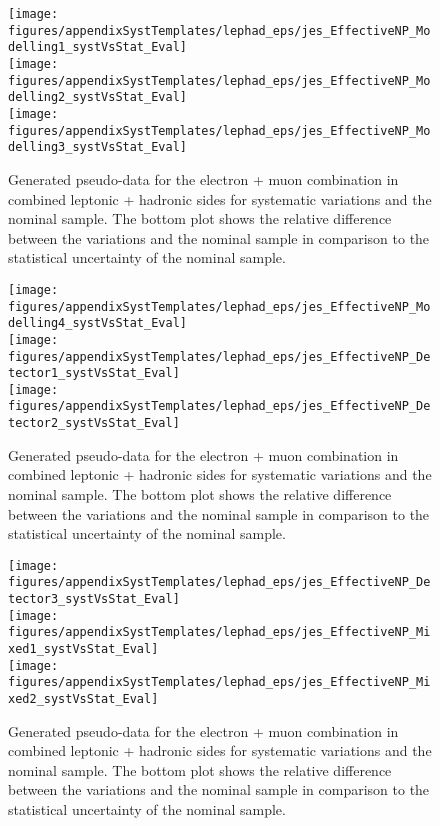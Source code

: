 \begin{figure}[!hb]
\begin{center}
        \texttt{[image: figures/appendixSystTemplates/lephad\_eps/jes\_EffectiveNP\_Modelling1\_systVsStat\_Eval]}\\
        \texttt{[image: figures/appendixSystTemplates/lephad\_eps/jes\_EffectiveNP\_Modelling2\_systVsStat\_Eval]}\\
        \texttt{[image: figures/appendixSystTemplates/lephad\_eps/jes\_EffectiveNP\_Modelling3\_systVsStat\_Eval]}
\caption{Generated pseudo-data for the electron + muon combination in combined leptonic + hadronic sides for systematic variations and the nominal \ttbar sample. The bottom plot shows the relative difference between the variations and the nominal sample in comparison to the statistical uncertainty of the nominal sample.}   
\label{fig:systematicVar_lephad_JES_1_2}
\end{center}
\end{figure}
        
\begin{figure}[!hb]
\begin{center}
        \texttt{[image: figures/appendixSystTemplates/lephad\_eps/jes\_EffectiveNP\_Modelling4\_systVsStat\_Eval]}\\
        \texttt{[image: figures/appendixSystTemplates/lephad\_eps/jes\_EffectiveNP\_Detector1\_systVsStat\_Eval]}\\
        \texttt{[image: figures/appendixSystTemplates/lephad\_eps/jes\_EffectiveNP\_Detector2\_systVsStat\_Eval]}
        
\caption{Generated pseudo-data for the electron + muon combination in combined leptonic + hadronic sides for systematic variations and the nominal \ttbar sample. The bottom plot shows the relative difference between the variations and the nominal sample in comparison to the statistical uncertainty of the nominal sample.}   
\label{fig:systematicVar_lephad_JES_2_1}
\end{center}
\end{figure}

\begin{figure}[!hb]
\begin{center}
        \texttt{[image: figures/appendixSystTemplates/lephad\_eps/jes\_EffectiveNP\_Detector3\_systVsStat\_Eval]}\\
        \texttt{[image: figures/appendixSystTemplates/lephad\_eps/jes\_EffectiveNP\_Mixed1\_systVsStat\_Eval]}\\
        \texttt{[image: figures/appendixSystTemplates/lephad\_eps/jes\_EffectiveNP\_Mixed2\_systVsStat\_Eval]}
\caption{Generated pseudo-data for the electron + muon combination in combined leptonic + hadronic sides for systematic variations and the nominal \ttbar sample. The bottom plot shows the relative difference between the variations and the nominal sample in comparison to the statistical uncertainty of the nominal sample.}   
\label{fig:systematicVar_lephad_JES_2_2}
\end{center}
\end{figure}
        
